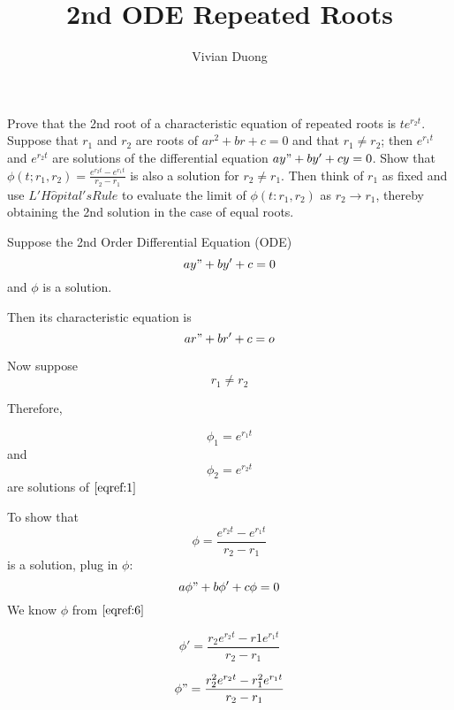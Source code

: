 \documentclass{article}
\title{2nd ODE Repeated Roots}
\author{Vivian Duong}
\begin{document}
\maketitle
Prove that the 2nd root of a characteristic equation of repeated roots is $te^{r_2t}$. Suppose that $r_1$ and $r_2$ are roots of $ar^2 + br + c = 0$ and that $r_1 \neq r_2$; then $e^{r_1t}$ and $e^{r_2t}$ are solutions of the differential equation $ay" + by' + cy = 0$. Show that $\phi(t; r_1, r_2) = \frac{e^{r_2t}-e^{r_1t}}{r_2-r_1}$ is also a solution for $r_2 \neq r_1$. Then think of $r_1$ as fixed and use $L'H\hat{o}pital's Rule$ to evaluate the limit of $\phi(t:r_1, r_2)$ as $r_2\rightarrow r_1$, thereby obtaining the 2nd solution in the case of equal roots.

Suppose the 2nd Order Differential Equation (ODE)
\begin{equation} \label{eqref:1}
ay" + by' + c =0
\end{equation}
and $\phi$ is a solution.

Then its characteristic equation is
\begin{equation} \label{eqref:2}
ar" + br' + c = o
\end{equation}

Now suppose
\begin{equation}
r_1 \neq r_2
\end{equation}

Therefore,

\begin{equation}
\phi_1 = e^{r_1t}
\end{equation}
and
\begin{equation}
\phi_2 = e^{r_2t}
\end{equation}
are solutions of $\eqref{eqref:1}$

To show that 
\begin{equation} \label{eqref:6}
\phi = \dfrac{e^{r_2t}-e^{r_1t}}{r_2-r_1}
\end{equation}
is a solution, plug in $\phi$:
\begin{equation}
a\phi" + b\phi' +c\phi = 0
\end{equation}
We know $\phi$ from $\eqref{eqref:6}$

\begin{equation}
\phi' = \dfrac{r_2e^{r_2t}-r1e^{r_1t}}{r_2-r_1}
\end{equation}

\begin{equation}
\phi" = \dfrac{r_2^2e^{r_2t}-r_1^2e^{r_1t}}{r_2-r_1}
\end{equation}
\end{document}
